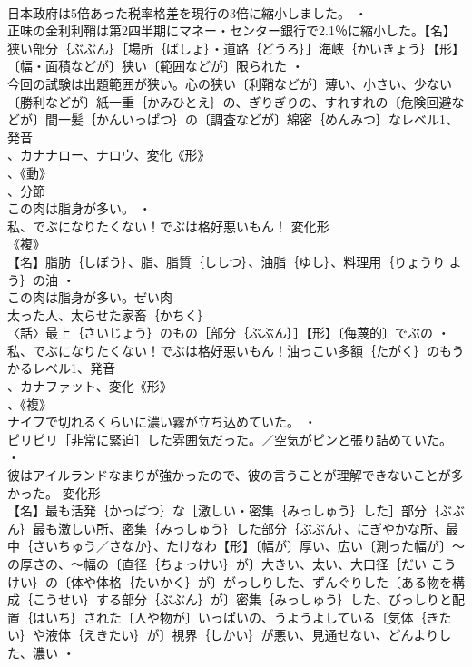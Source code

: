 \documentclass[8pt]{extreport}
\begin{document}
\begin{CJK}{UTF8}{min}
\\	日本政府は5倍あった税率格差を現行の3倍に縮小しました。 ・
\\	正味の金利利鞘は第2四半期にマネー・センター銀行で2.1％に縮小した。【名】狭い部分｛ぶぶん｝［場所｛ばしょ｝・道路｛どうろ｝］海峡｛かいきょう｝【形】〔幅・面積などが〕狭い〔範囲などが〕限られた ・
\\	今回の試験は出題範囲が狭い。心の狭い〔利鞘などが〕薄い、小さい、少ない〔勝利などが〕紙一重｛かみひとえ｝の、ぎりぎりの、すれすれの〔危険回避などが〕間一髪｛かんいっぱつ｝の〔調査などが〕綿密｛めんみつ｝なレベル1、発音
\\	、カナナロー、ナロウ、変化《形》
\\	、《動》
\\	、分節
\\	この肉は脂身が多い。 ・
\\	私、でぶになりたくない！でぶは格好悪いもん！	変化形 
\\	《複》
\\	【名】脂肪｛しぼう｝、脂、脂質｛ししつ｝、油脂｛ゆし｝、料理用｛りょうり よう｝の油 ・
\\	この肉は脂身が多い。ぜい肉
\\	太った人、太らせた家畜｛かちく｝
\\	〈話〉最上｛さいじょう｝のもの［部分｛ぶぶん｝］【形】〔侮蔑的〕でぶの ・
\\	私、でぶになりたくない！でぶは格好悪いもん！油っこい多額｛たがく｝のもうかるレベル1、発音
\\	、カナファット、変化《形》
\\	、《複》
\\	ナイフで切れるくらいに濃い霧が立ち込めていた。 ・
\\	ピリピリ［非常に緊迫］した雰囲気だった。／空気がピンと張り詰めていた。 ・
\\	彼はアイルランドなまりが強かったので、彼の言うことが理解できないことが多かった。	変化形 
\\	【名】最も活発｛かっぱつ｝な［激しい・密集｛みっしゅう｝した］部分｛ぶぶん｝最も激しい所、密集｛みっしゅう｝した部分｛ぶぶん｝、にぎやかな所、最中｛さいちゅう／さなか｝、たけなわ【形】〔幅が〕厚い、広い〔測った幅が〕～の厚さの、～幅の〔直径｛ちょっけい｝が〕大きい、太い、大口径｛だい こうけい｝の〔体や体格｛たいかく｝が〕がっしりした、ずんぐりした〔ある物を構成｛こうせい｝する部分｛ぶぶん｝が〕密集｛みっしゅう｝した、びっしりと配置｛はいち｝された〔人や物が〕いっぱいの、うようよしている〔気体｛きたい｝や液体｛えきたい｝が〕視界｛しかい｝が悪い、見通せない、どんよりした、濃い ・

\end{CJK}
\end{document}
